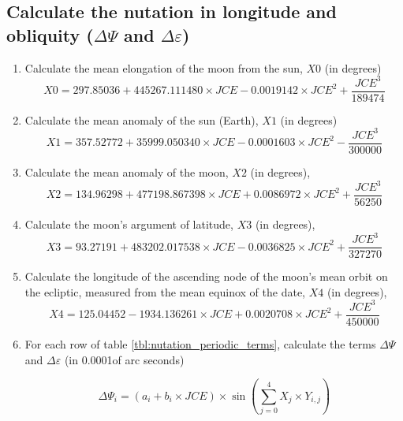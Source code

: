 \documentclass{article}
\begin{document}
\subsection{Calculate the nutation in longitude and obliquity
  ($\Delta\Psi$ and $\Delta\varepsilon$)}

\begin{enumerate}
\item Calculate the mean elongation of the moon from the sun, $X0$ (in
  degrees)
  \begin{equation}
    \label{eq:x0}
    X0 = 297.85036 + 445267.111480 \times JCE - 0.0019142 \times JCE^2 + \frac{JCE^3}{189474}
  \end{equation}

\item Calculate the mean anomaly of the sun (Earth), $X1$ (in degrees)
  \begin{equation}
    \label{eq:x1}
    X1 = 357.52772 + 35999.050340 \times JCE - 0.0001603 \times JCE^2 - \frac{JCE^3}{300000}
  \end{equation}

\item Calculate the mean anomaly of the moon, $X2$ (in degrees),
  \begin{equation}
    \label{eq:x2}
    X2 = 134.96298 + 477198.867398 \times JCE + 0.0086972 \times JCE^2 + \frac{JCE^3}{56250}
  \end{equation}

\item Calculate the moon’s argument of latitude, $X3$ (in degrees),
  \begin{equation}
    \label{eq:x3}
    X3 = 93.27191 + 483202.017538 \times JCE - 0.0036825 \times JCE^2 + \frac{JCE^3}{327270}
  \end{equation}

\item Calculate the longitude of the ascending node of the moon’s mean
  orbit on the ecliptic, measured from the mean equinox of the date,
  $X4$ (in degrees),
  \begin{equation}
    \label{eq:x4}
    X4 = 125.04452 - 1934.136261 \times JCE + 0.0020708 \times JCE^2 + \frac{JCE^3}{450000}
  \end{equation}

\item For each row of table \ref{tbl:nutation_periodic_terms},
  calculate the terms $\Delta\Psi$ and $\Delta\varepsilon$ (in 0.0001of arc seconds)

  \begin{equation}
    \label{eq:delta_psi_i}
    \Delta\Psi_i = (a_i + b_i \times JCE) \times \sin\left(\sum_{j=0}^4 X_j \times Y_{i,j}\right)
  \end{equation}


\end{enumerate}
\end{document}

